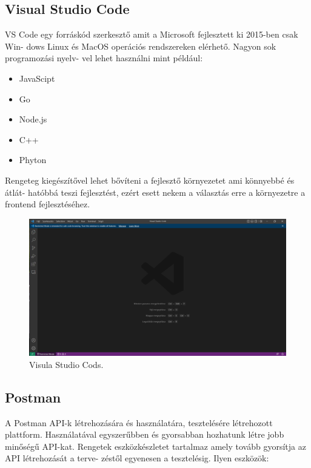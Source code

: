 \subsection{Visual Studio Code}

VS Code egy forráskód szerkesztő amit a Microsoft fejlesztett ki 2015-ben csak Win-
dows Linux és MacOS operációs rendszereken elérhető. Nagyon sok programozási nyelv-
vel lehet használni mint például:

\begin{itemize}
\item JavaScipt
\item Go
\item Node.js
\item C++
\item Phyton
\end{itemize}

Rengeteg kiegészítővel lehet bővíteni a fejlesztő környezetet ami könnyebbé és átlát-
hatóbbá teszi  fejlesztést, ezért esett nekem a választás erre a környezetre a frontend fejlesztéséhez.

\begin{figure}[h]
\centering
\includegraphics[scale=0.6]{images/VSCode.png}
\caption{Visula Studio Cods.}
\label{fig:VSCode}
\end{figure}
\newpage

\subsection{Postman}

A Postman API-k létrehozására és használatára, tesztelésére létrehozott plattform. Használatával egyszerűbben és gyorsabban hozhatunk létre jobb minőségű API-kat. Rengetek eszközkészletet tartalmaz amely tovább gyorsítja az API létrehozását a  terve-
zéstől egyenesen a tesztelésig. Ilyen eszközök:

